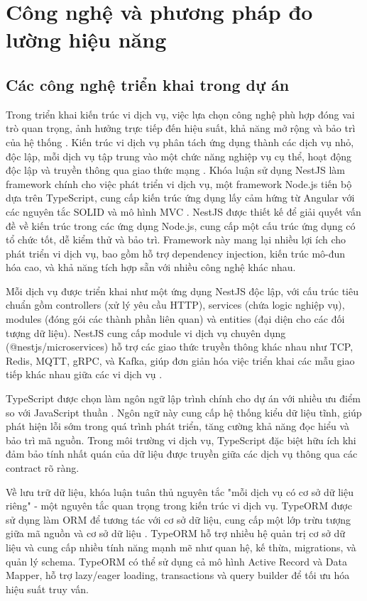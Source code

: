 \section{Công nghệ và phương pháp đo lường hiệu năng}

\subsection{Các công nghệ triển khai trong dự án}
Trong triển khai kiến trúc vi dịch vụ, việc lựa chọn công nghệ phù hợp đóng vai trò quan trọng, ảnh hưởng trực tiếp đến hiệu suất, khả năng mở rộng và bảo trì của hệ thống \cite{newman2015}. Kiến trúc vi dịch vụ phân tách ứng dụng thành các dịch vụ nhỏ, độc lập, mỗi dịch vụ tập trung vào một chức năng nghiệp vụ cụ thể, hoạt động độc lập và truyền thông qua giao thức mạng \cite{dragoni2018}. Khóa luận sử dụng NestJS làm framework chính cho việc phát triển vi dịch vụ, một framework Node.js tiến bộ dựa trên TypeScript, cung cấp kiến trúc ứng dụng lấy cảm hứng từ Angular với các nguyên tắc SOLID và mô hình MVC \cite{nestjs2023}. NestJS được thiết kế để giải quyết vấn đề về kiến trúc trong các ứng dụng Node.js, cung cấp một cấu trúc ứng dụng có tổ chức tốt, dễ kiểm thử và bảo trì. Framework này mang lại nhiều lợi ích cho phát triển vi dịch vụ, bao gồm hỗ trợ dependency injection, kiến trúc mô-đun hóa cao, và khả năng tích hợp sẵn với nhiều công nghệ khác nhau.

Mỗi dịch vụ được triển khai như một ứng dụng NestJS độc lập, với cấu trúc tiêu chuẩn gồm controllers (xử lý yêu cầu HTTP), services (chứa logic nghiệp vụ), modules (đóng gói các thành phần liên quan) và entities (đại diện cho các đối tượng dữ liệu). NestJS cung cấp module vi dịch vụ chuyên dụng (@nestjs/microservices) hỗ trợ các giao thức truyền thông khác nhau như TCP, Redis, MQTT, gRPC, và Kafka, giúp đơn giản hóa việc triển khai các mẫu giao tiếp khác nhau giữa các vi dịch vụ \cite{farcic2016}.

TypeScript được chọn làm ngôn ngữ lập trình chính cho dự án với nhiều ưu điểm so với JavaScript thuần \cite{bierman2014}. Ngôn ngữ này cung cấp hệ thống kiểu dữ liệu tĩnh, giúp phát hiện lỗi sớm trong quá trình phát triển, tăng cường khả năng đọc hiểu và bảo trì mã nguồn. Trong môi trường vi dịch vụ, TypeScript đặc biệt hữu ích khi đảm bảo tính nhất quán của dữ liệu được truyền giữa các dịch vụ thông qua các contract rõ ràng.

Về lưu trữ dữ liệu, khóa luận tuân thủ nguyên tắc "mỗi dịch vụ có cơ sở dữ liệu riêng" - một nguyên tắc quan trọng trong kiến trúc vi dịch vụ. TypeORM được sử dụng làm ORM để tương tác với cơ sở dữ liệu, cung cấp một lớp trừu tượng giữa mã nguồn và cơ sở dữ liệu \cite{typeorm2023}. TypeORM hỗ trợ nhiều hệ quản trị cơ sở dữ liệu và cung cấp nhiều tính năng mạnh mẽ như quan hệ, kế thừa, migrations, và quản lý schema. TypeORM có thể sử dụng cả mô hình Active Record và Data Mapper, hỗ trợ lazy/eager loading, transactions và query builder để tối ưu hóa hiệu suất truy vấn.

